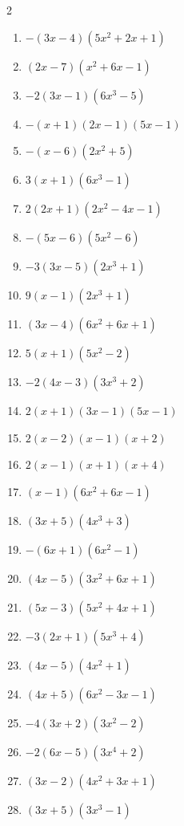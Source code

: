 \documentclass[11pt,oneside]{book}
\begin{document}
\begin{multicols}{2}
\begin{enumerate}[leftmargin=*,label=\textbf{G\arabic*.},itemsep=0.45\baselineskip]
\item $ - \left(3 x - 4\right) \left(5 x^{2} + 2 x + 1\right) $
\item $ \left(2 x - 7\right) \left(x^{2} + 6 x - 1\right) $
\item $ - 2 \left(3 x - 1\right) \left(6 x^{3} - 5\right) $
\item $ - \left(x + 1\right) \left(2 x - 1\right) \left(5 x - 1\right) $
\item $ - \left(x - 6\right) \left(2 x^{2} + 5\right) $
\item $ 3 \left(x + 1\right) \left(6 x^{3} - 1\right) $
\item $ 2 \left(2 x + 1\right) \left(2 x^{2} - 4 x - 1\right) $
\item $ - \left(5 x - 6\right) \left(5 x^{2} - 6\right) $
\item $ - 3 \left(3 x - 5\right) \left(2 x^{3} + 1\right) $
\item $ 9 \left(x - 1\right) \left(2 x^{3} + 1\right) $
\item $ \left(3 x - 4\right) \left(6 x^{2} + 6 x + 1\right) $
\item $ 5 \left(x + 1\right) \left(5 x^{2} - 2\right) $
\item $ - 2 \left(4 x - 3\right) \left(3 x^{3} + 2\right) $
\item $ 2 \left(x + 1\right) \left(3 x - 1\right) \left(5 x - 1\right) $
\item $ 2 \left(x - 2\right) \left(x - 1\right) \left(x + 2\right) $
\item $ 2 \left(x - 1\right) \left(x + 1\right) \left(x + 4\right) $
\item $ \left(x - 1\right) \left(6 x^{2} + 6 x - 1\right) $
\item $ \left(3 x + 5\right) \left(4 x^{3} + 3\right) $
\item $ - \left(6 x + 1\right) \left(6 x^{2} - 1\right) $
\item $ \left(4 x - 5\right) \left(3 x^{2} + 6 x + 1\right) $
\item $ \left(5 x - 3\right) \left(5 x^{2} + 4 x + 1\right) $
\item $ - 3 \left(2 x + 1\right) \left(5 x^{3} + 4\right) $
\item $ \left(4 x - 5\right) \left(4 x^{2} + 1\right) $
\item $ \left(4 x + 5\right) \left(6 x^{2} - 3 x - 1\right) $
\item $ - 4 \left(3 x + 2\right) \left(3 x^{2} - 2\right) $
\item $ - 2 \left(6 x - 5\right) \left(3 x^{4} + 2\right) $
\item $ \left(3 x - 2\right) \left(4 x^{2} + 3 x + 1\right) $
\item $ \left(3 x + 5\right) \left(3 x^{3} - 1\right) $
\end{enumerate}
\end{multicols}
\end{document}
